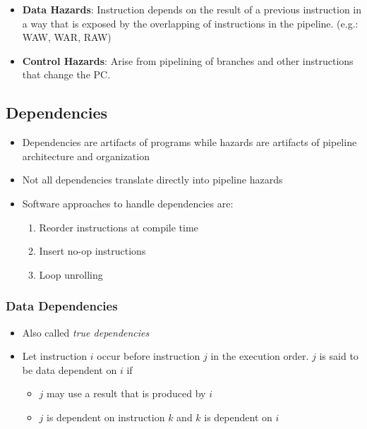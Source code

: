 \documentclass{article}
\begin{document}
\begin{itemize}
\begin{itemize}
        \item \textbf{Data Hazards}: Instruction depends on the result of a previous instruction in a way that is exposed by the overlapping of instructions in the pipeline. (e.g.: WAW, WAR, RAW)
        
        \item \textbf{Control Hazards}: Arise from pipelining of branches and other instructions that change the PC.
    \end{itemize}
\end{itemize}

\subsection{Dependencies}
\begin{itemize}
    \item Dependencies are artifacts of programs while hazards are artifacts of pipeline architecture and organization
    
    \item Not all dependencies translate directly into pipeline hazards
    
    \item Software approaches to handle dependencies are:
    \begin{enumerate}
        \item Reorder instructions at compile time
        
        \item Insert no-op instructions
        
        \item Loop unrolling
    \end{enumerate}
\end{itemize}

\subsubsection{Data Dependencies}
\begin{itemize}
    \item Also called \textit{true dependencies}
    
    \item Let instruction $i$ occur before instruction $j$ in the execution order. $j$ is said to be data dependent on $i$ if
    \begin{itemize}
        \item $j$ may use a result that is produced by $i$
        
        \item $j$ is dependent on instruction $k$ and $k$ is dependent on $i$
    \end{itemize}
\end{itemize}
\end{document}
